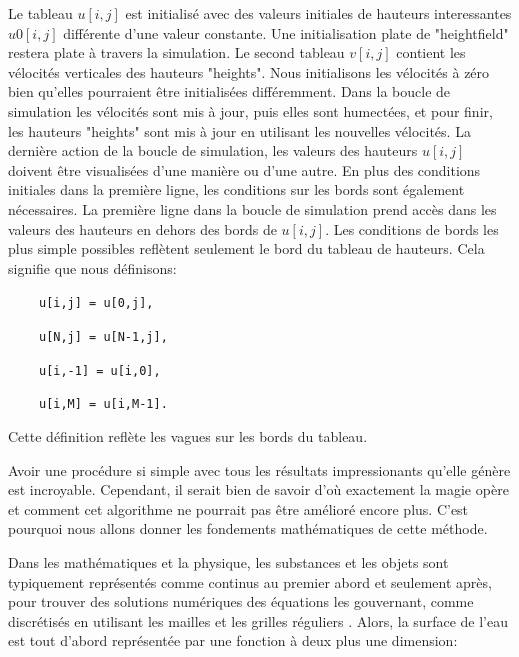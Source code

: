 \documentclass[11pt]{report}
\begin{document}
Le tableau $u[i,j]$ est initialisé avec des valeurs initiales de hauteurs interessantes $u0[i,j]$ différente d'une valeur constante. Une initialisation plate de "heightfield" restera plate à travers la simulation. Le second tableau $v[i,j]$ contient les vélocités verticales des hauteurs "heights". Nous initialisons les vélocités à zéro bien qu'elles pourraient être initialisées différemment. Dans la boucle de simulation les vélocités sont mis à jour, puis elles sont humectées, et pour finir, les hauteurs "heights" sont mis à jour en utilisant les nouvelles vélocités. La dernière action de la boucle de simulation, les valeurs des hauteurs $u[i,j]$ doivent être visualisées d'une manière ou d'une autre. En plus des conditions initiales dans la première ligne, les conditions sur les bords sont également nécessaires. La première ligne dans la boucle de simulation prend accès dans les valeurs des hauteurs en dehors des bords de $u[i,j]$. Les conditions de bords les plus simple possibles reflètent seulement le bord du tableau de hauteurs. Cela signifie que nous définisons:\newline
\begin{itemize}

\item[
\texttt{
	u[i,j] = u[0,j],\newline
}]
\item[
\texttt{
	u[N,j] = u[N-1,j],\newline
}]
\item[
\texttt{
	u[i,-1] = u[i,0],\newline
}]
\item[
\texttt{
	u[i,M] = u[i,M-1].
}]

\end{itemize}


\vspace{2em}
Cette définition reflète les vagues sur les bords du tableau.

Avoir une procédure si simple avec tous les résultats impressionants qu'elle génère est incroyable. Cependant, il serait bien de savoir d'où exactement la magie opère et comment cet algorithme ne pourrait pas être amélioré encore plus. C'est pourquoi nous allons donner les fondements mathématiques de cette méthode.

Dans les mathématiques et la physique, les substances et les objets sont typiquement représentés comme continus au premier abord et seulement après, pour trouver des solutions numériques des équations les gouvernant, comme discrétisés en utilisant les mailles et les grilles réguliers \cite{jeffrey-2003}. Alors, la surface de l'eau est tout d'abord représentée par une fonction à deux plus une dimension:
\end{document}
